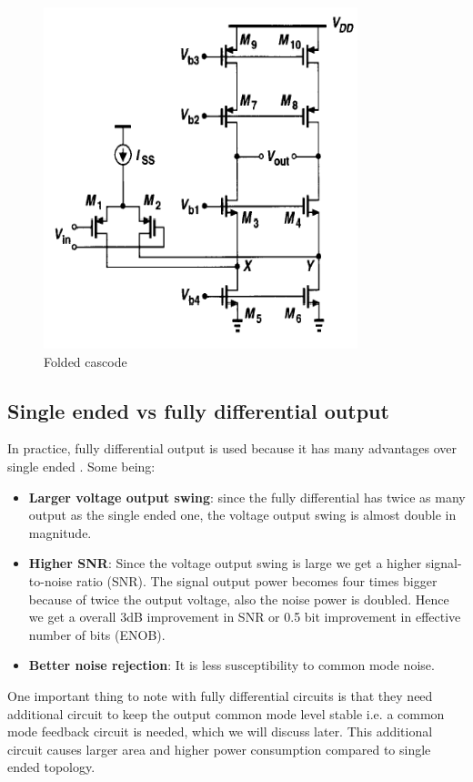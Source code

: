 \begin{figure}
\begin{minipage}[c]{0.5\linewidth}
\includegraphics[width=\linewidth]{images/folded.png}
\caption{Folded cascode}
\label{fold}
\end{minipage}%
\end{figure}

\subsection{Single ended vs fully differential output }
In practice, fully differential output is used because it has many advantages over single ended \cite{Johns}. Some being:

\begin{itemize}

\item \textbf{Larger voltage output swing}: since the fully differential has twice as many output as the single ended one, the voltage output swing is almost double in magnitude. 

\item \textbf{Higher SNR}: Since the voltage output swing is large we get a higher signal-to-noise ratio (SNR). The signal output power becomes four times bigger because of twice the output voltage, also the noise power is doubled. Hence we get a overall 3dB improvement in SNR or 0.5 bit improvement in effective number of bits (ENOB).

\item \textbf{Better noise rejection}: It is less susceptibility to common mode noise.
\end{itemize}
One important thing to note with fully differential circuits is that they need additional circuit to keep the output common mode level stable i.e. a common mode feedback circuit is needed, which we will discuss later. This additional circuit causes larger area and higher power consumption compared to single ended topology\cite{Allen}. 

